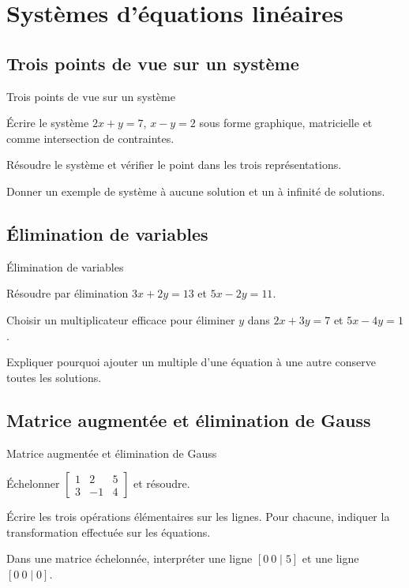 \chapter{Systèmes d'équations linéaires}
\label{workbook:chapter:12}
\section{Trois points de vue sur un système}
\label{workbook:section:12.01}
\begin{exerciseblock}{Trois points de vue sur un système}
\item Écrire le système $2x+y=7$, $x-y=2$ sous forme graphique, matricielle et comme intersection de contraintes.
\item Résoudre le système et vérifier le point dans les trois représentations.
\item Donner un exemple de système à aucune solution et un à infinité de solutions.
\end{exerciseblock}
\section{Élimination de variables}
\label{workbook:section:12.02}
\begin{exerciseblock}{Élimination de variables}
\item Résoudre par élimination $3x+2y=13$ et $5x-2y=11$.
\item Choisir un multiplicateur efficace pour éliminer $y$ dans $2x+3y=7$ et $5x-4y=1$.
\item Expliquer pourquoi ajouter un multiple d'une équation à une autre conserve toutes les solutions.
\end{exerciseblock}
\section{Matrice augmentée et élimination de Gauss}
\label{workbook:section:12.03}
\begin{exerciseblock}{Matrice augmentée et élimination de Gauss}
\item Échelonner $\left[\begin{array}{cc|c}1&2&5\\3&-1&4\end{array}\right]$ et résoudre.
\item Écrire les trois opérations élémentaires sur les lignes. Pour chacune, indiquer la transformation effectuée sur les équations.
\item Dans une matrice échelonnée, interpréter une ligne $[0\ 0\mid 5]$ et une ligne $[0\ 0\mid0]$.
\end{exerciseblock}
